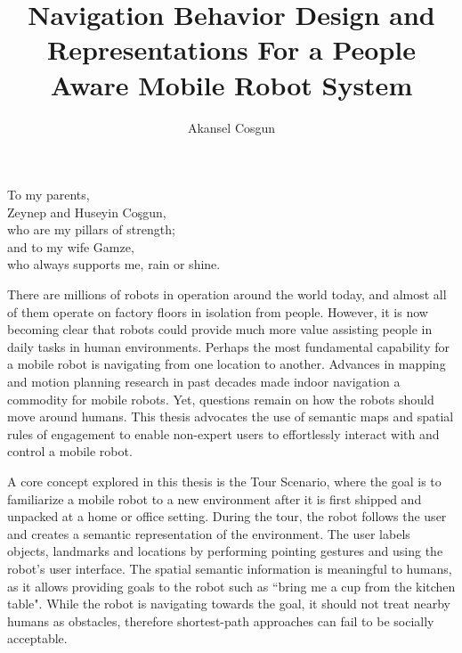 \documentclass[12pt]{gatech-thesis}
\title{Navigation Behavior Design and Representations For a People Aware Mobile Robot System}
\author{Akansel Cosgun}
\begin{document}
%

\begin{preliminary}

\begin{dedication}
\null\vfil
{\large
\begin{center}
To my parents,\\\vspace{12pt}
Zeynep and Huseyin Co\c{s}gun,\\\vspace{12pt}
who are my pillars of strength;\\\vspace{12pt}
and to my wife Gamze,\\\vspace{12pt}
who always supports me, rain or shine.\\\vspace{12pt}
\end{center}}
\vfil\null
\end{dedication}






\contents
\begin{summary}

There are millions of robots in operation around the world today, and almost all of them operate on factory floors in isolation from people. However, it is now becoming clear that robots could provide much more value assisting people in daily tasks in human environments. Perhaps the most fundamental capability for a mobile robot is navigating from one location to another. Advances in mapping and motion planning research in past decades made indoor navigation a commodity for mobile robots. Yet, questions remain on how the robots should move around humans. This thesis advocates the use of semantic maps and spatial rules of engagement to enable non-expert users to effortlessly interact with and control a mobile robot.

A core concept explored in this thesis is the Tour Scenario, where the goal is to familiarize a mobile robot to a new environment after it is first shipped and unpacked at a home or office setting. During the tour, the robot follows the user and creates a semantic representation of the environment. The user labels objects, landmarks and locations by performing pointing gestures and using the robot's user interface. The spatial semantic information is meaningful to humans, as it allows providing goals to the robot such as ``bring me a cup from the kitchen table". While the robot is navigating towards the goal, it should not treat nearby humans as obstacles, therefore shortest-path approaches can fail to be socially acceptable.


\end{summary}
\end{preliminary}
\end{document}
